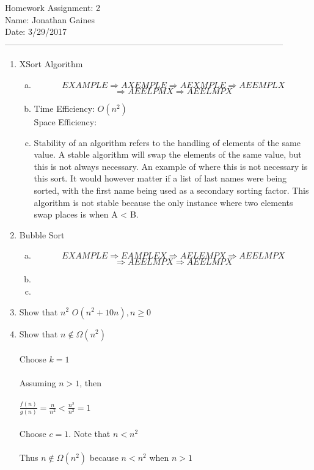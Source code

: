 \documentclass[12pt]{article}
\newcommand\tab[1][1cm]{\hspace*{#1}}
\begin{document}
Homework Assignment: 2\\ 
Name: Jonathan Gaines\\ 
Date: 3/29/2017\\ --------------------------------------------------------------------------------------------------
\begin {enumerate}
\item XSort Algorithm
	\begin {enumerate}[(a)]
		\item
		$$EXAMPLE\Rightarrow 
			AXEMPLE\Rightarrow	
			AEXMPLE\Rightarrow
			AEEMPLX$$ $$\Rightarrow 
		  AEELPMX\Rightarrow
			AEELMPX $$		
		\item
			Time Efficiency: $O(n^{2})$ \\
			Space Efficiency: 
		\item 
			Stability of an algorithm refers to the handling of elements of the same value. A stable algorithm will swap the elements of the same value, but this is not always necessary. An example of where this is not necessary is this sort. It would however matter if a list of last names were being sorted, with the first name being used as a secondary sorting factor. This algorithm is not stable because the only instance where two elements swap places is when A < B. \par  
	\end {enumerate}
\item Bubble Sort
	\begin {enumerate}[(a)]
		\item
		$$EXAMPLE\Rightarrow 
			EAMPLEX\Rightarrow	
			AELEMPX\Rightarrow
			AEELMPX$$ $$\Rightarrow
			AEELMPX\Rightarrow
			AEELMPX $$
		\item
		\item
	\end {enumerate}
\item Show that $n^{2}$ \in $O(n^{2}+10n), n \geq 0$

\item Show that $n \not\in \Omega(n^{2})$ \\ \\
	\tab Choose $k=1$ \\ \\
	\tab Assuming $n > 1$, then \\ \\
	\tab $\frac{f(n)}{g(n)} = \frac{n}{n^{2}} < \frac{n^{2}}{n^{2}} = 1$ \\ \\
	\tab Choose $c=1$. Note that $n < n^{2}$ \\ \\
	\tab Thus $n \not\in \Omega(n^{2})$ because $n<n^{2}$ when $n>1$
\end {enumerate}
\end{document}
